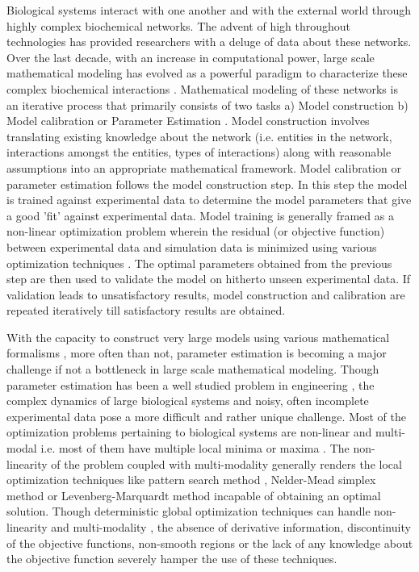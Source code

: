 \documentclass[12pt]{article}
\begin{document}
Biological systems interact with one another and with the external world through highly complex biochemical networks. The advent of high throughout technologies has provided researchers with a deluge of data about these networks. Over the last decade, with an increase in computational power, large scale mathematical modeling has evolved as a powerful paradigm to characterize these complex biochemical interactions \cite{assmus2006dynamics, Riel:2006aa,Jaqaman:2006aa,kitano2002systems,hood2004systems}. Mathematical modeling of these networks is an iterative process that primarily consists of two tasks a) Model construction b) Model calibration or Parameter Estimation \cite{Aldridge:2006aa,banga2008optimization,ashyraliyev2009systems}. Model construction involves translating existing knowledge about the network (i.e. entities in the network, interactions amongst the entities, types of interactions) along with reasonable assumptions into an appropriate mathematical framework. Model calibration or parameter estimation follows the model construction step.  In this step the model is trained against experimental data to determine the model parameters that give a good 'fit' against experimental data. Model training is generally framed as a non-linear optimization problem wherein the residual (or objective function) between experimental data and simulation data is minimized using various optimization techniques \cite{moles2003parameter}. The optimal parameters obtained from the previous step are then used to validate the model on hitherto unseen experimental data. If validation leads to unsatisfactory results, model construction and calibration are repeated iteratively till satisfactory results are obtained.

With the capacity to construct very large models using various mathematical formalisms \cite{chen2009input,tasseff2011modeling,luan2007computationally,mo2007genome,orth2011comprehensive,karr2012whole,buchel2013path2models,smallbone2010towards}, more often than not, parameter estimation is becoming a major challenge if not a bottleneck in large scale mathematical modeling. Though parameter estimation has been a well studied problem in engineering \cite{nieman1971review,beck1977parameter,young1981parameter,beck1998inverse}, the complex dynamics of large biological systems and noisy, often incomplete experimental data pose a more difficult and rather unique challenge. Most of the optimization problems pertaining to biological systems are non-linear and multi-modal i.e. most of them have multiple local minima or maxima \cite{moles2003parameter,banga2008optimization}. The non-linearity of the problem coupled with multi-modality generally renders the local optimization techniques like pattern search method \cite{hooke1961direct}, Nelder-Mead simplex method \cite{nelder1965simplex} or Levenberg-Marquardt method\cite{more1978levenberg} incapable of obtaining an optimal solution. Though deterministic global optimization techniques can handle non-linearity and multi-modality \cite{esposito2000deterministic,horst2013global}, the absence of derivative information, discontinuity of the objective functions, non-smooth regions or the lack of any knowledge about the objective function severely hamper the use of these techniques.
\end{document}
